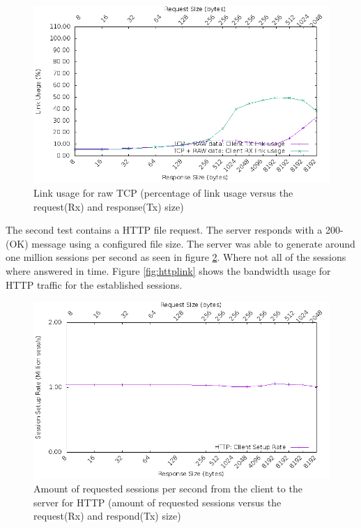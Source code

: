 \begin{figure}[H]
  \includegraphics[scale=0.6]{images/raw_link_usage.png}
  \caption{Link usage for raw TCP (percentage of link usage versus the request(Rx) and response(Tx) size)}
  \label{fig:rawtcplink}
\end{figure}

The second test contains a HTTP file request. The server responds with a 200-(OK) message using a configured file size.
The server was able to generate around one million sessions per second as seen in figure \ref{fig:httpsession}. Where not all of the sessions where answered in time.
Figure \ref{fig:httplink} shows the bandwidth usage for HTTP traffic for the established sessions. 

\begin{figure}[H]
  \includegraphics[scale=0.6]{images/http_setup.png}
  \caption{Amount of requested sessions per second from the client to the server for HTTP (amount of requested sessions versus the request(Rx) and respond(Tx) size)}
  \label{fig:httpsession}
\end{figure}


